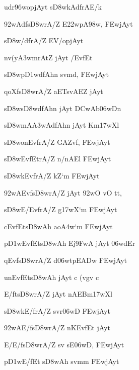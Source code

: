 {\dn udr\396wopjAy\?t s\3D8w\4kAdfrAE/k\? \vegdn\dontdisplaylinenum}

{\dn \392wAdfs\3D8wrA/\?Z E\322wpA\398w\?{\qvb}, \3FEwjAyt\?{\dandabdn} \dontdisplaylinenum}

{\dn s\3D8w/\4dfrA/\?Z EV/opjAyt\? \vegdn\dontdisplaylinenum}

{\dn nv(y\3A3wmrAt\?Z jAyt\? /Ev\2fEt{\dandabdn} \dontdisplaylinenum}

{\dn s\3D8wp\3D1wdfAh\?n sv\0m\?d, \3FEwjAyt\? \vegdn\dontdisplaylinenum}

{\dn qoXfs\3D8wrA/\?Z aETsvA\0EZ jAyt\?{\dandabdn} \dontdisplaylinenum}

{\dn s\3D8ws\3D8wdfAh\?n jAyt\? \3DCwAb\306wDn \vegdn\dontdisplaylinenum}

{\dn s\3D8wmA\3A3wAdfAh\?n jAyt\? Km\317wXl \dontdisplaylinenum}

{\dn s\3D8wonEv\2frA/\?Z G\5AZv\2f, \3FEwjAyt\? \vegdn\dontdisplaylinenum}

{\dn s\3D8wEv\2fEtrA/\?Z n\4/nAEl\2 \3FEwjAyt\?{\dandabdn} \dontdisplaylinenum}

{\dn s\3D8w\4kEv\2frA/\?Z kZ\0`m\2 \3FEwjAyt\? \vegdn\dontdisplaylinenum}

{\dn \392wAEv\2fs\3D8wrA/\?Z jAyt\? \392wO \5vO tt,{\dandabdn} \dontdisplaylinenum}

{\dn s\3D8wE/Ev\2frA/\?Z g\317wX`m\2 \3FEwjAyt\? \vegdn\dontdisplaylinenum}

{\dn cEv{\rdt}fEts\3D8wAh\? ao\3A4w`m\2 \3FEwjAyt\?{\dandabdn} \dontdisplaylinenum}

{\dn p\3D1wEv\2fEts\3D8wAh\? Ej\39FwA jAyt\? \306wdEr \vegdn\dontdisplaylinenum}

{\dn qEv\2fs\3D8wrA/\?Z d\306wtpE\3ADw \3FEwjAyt\?{\dandabdn} \dontdisplaylinenum}

{\dn unEv\2fEts\3D8wAh\? jAyt\? c (vg\?v c \vegdn\dontdisplaylinenum}

{\dn E/\2fts\3D8wrA/\?Z jAyt\? nAEBm\317wXl \dontdisplaylinenum}

{\dn s\3D8w\4kE/\2frA/\?Z sv\0r\306wD\5\2 \3FEwjAyt\? \vegdn\dontdisplaylinenum}

{\dn \392wAE/\2fs\3D8wrA/\?Z nKEv\2fEt jAyt\?{\dandabdn} \dontdisplaylinenum}

{\dn E/E/\2fs\3D8wrA/\?Z sv\?{\qvb} sE\306wD, \3FEwjAyt\? \vegdn\dontdisplaylinenum}

{\dn p\3D1wE/\2fEt s\3D8wAh\? sv\0mm\0 \3FEwjAyt\?{\dandabdn} \dontdisplaylinenum}

